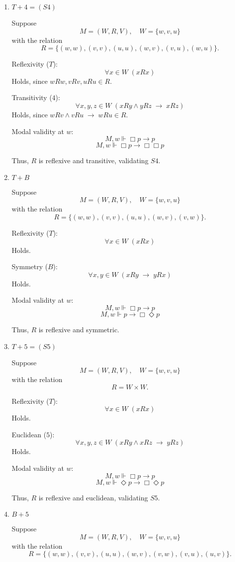 \documentclass[12pt,a4paper,openany]{article}
\begin{document}
\begin{enumerate}
    \item \textbf{$T+4 = (S4)$}
    
    Suppose
    $$M = (W, R, V), \quad W = \{w, v, u\}$$
    with the relation
    $$R = \{(w,w), (v,v), (u,u), (w,v), (v,u), (w,u)\}.$$
    
    Reflexivity ($T$):
    $$\forall x \in W \; (xRx)$$
    Holds, since $wRw, vRv, uRu \in R$.
    
    Transitivity ($4$):
    $$\forall x,y,z \in W \; (xRy \wedge yRz \;\to\; xRz)$$
    Holds, since $wRv \wedge vRu \;\to\; wRu \in R$.
    
    Modal validity at $w$:
    $$M,w \Vdash \Box p \to p$$
    $$M,w \Vdash \Box p \to \Box \Box p$$
    
    Thus, $R$ is reflexive and transitive, validating $S4$.
    
    \item \textbf{$T+B$}
    
    Suppose
    $$M = (W, R, V), \quad W = \{w, v, u\}$$
    with the relation
    $$R = \{(w,w), (v,v), (u,u), (w,v), (v,w)\}.$$
    
    Reflexivity ($T$):
    $$\forall x \in W \; (xRx)$$
    Holds.
    
    Symmetry ($B$):
    $$\forall x,y \in W \; (xRy \;\to\; yRx)$$
    Holds.
    
    Modal validity at $w$:
    $$M,w \Vdash \Box p \to p$$
    $$M,w \Vdash p \to \Box \Diamond p$$
    
    Thus, $R$ is reflexive and symmetric.
    
    \item \textbf{$T+5 =(S5)$}
    
    Suppose
    $$M = (W, R, V), \quad W = \{w, v, u\}$$
    with the relation
    $$R = W \times W.$$
    
    Reflexivity ($T$):
    $$\forall x \in W \; (xRx)$$
    Holds.
    
    Euclidean ($5$):
    $$\forall x,y,z \in W \; (xRy \wedge xRz \;\to\; yRz)$$
    Holds.
    
    Modal validity at $w$:
    $$M,w \Vdash \Box p \to p$$
    $$M,w \Vdash \Diamond p \to \Box \Diamond p$$
    
    Thus, $R$ is reflexive and euclidean, validating $S5$.
    
    \item \textbf{$B+5$}
    
    Suppose
    $$M = (W, R, V), \quad W = \{w, v, u\}$$
    with the relation
    $$R = \{(w,w), (v,v), (u,u), (w,v), (v,w), (v,u), (u,v)\}.$$
    

\end{enumerate}
\end{document}
